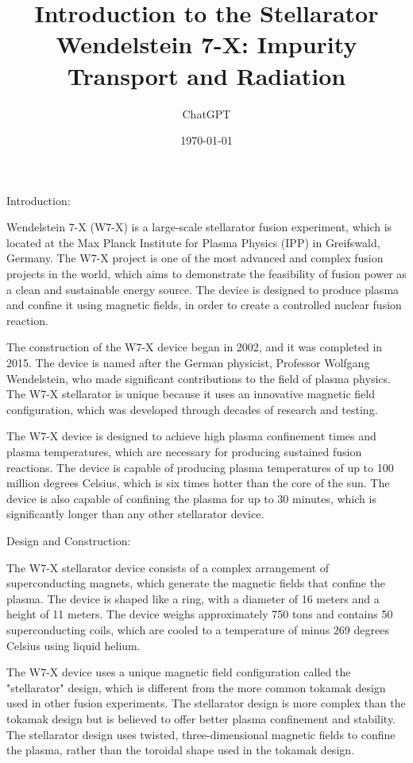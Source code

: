 \documentclass[12pt]{article}
\begin{document}
\title{Introduction to the Stellarator Wendelstein 7-X: Impurity Transport and Radiation}

\author{ChatGPT}

\date{\today}

\maketitle

Introduction:

Wendelstein 7-X (W7-X) is a large-scale stellarator fusion experiment, which is located at the Max Planck Institute for Plasma Physics (IPP) in Greifswald, Germany. The W7-X project is one of the most advanced and complex fusion projects in the world, which aims to demonstrate the feasibility of fusion power as a clean and sustainable energy source. The device is designed to produce plasma and confine it using magnetic fields, in order to create a controlled nuclear fusion reaction.

The construction of the W7-X device began in 2002, and it was completed in 2015. The device is named after the German physicist, Professor Wolfgang Wendelstein, who made significant contributions to the field of plasma physics. The W7-X stellarator is unique because it uses an innovative magnetic field configuration, which was developed through decades of research and testing.

The W7-X device is designed to achieve high plasma confinement times and plasma temperatures, which are necessary for producing sustained fusion reactions. The device is capable of producing plasma temperatures of up to 100 million degrees Celsius, which is six times hotter than the core of the sun. The device is also capable of confining the plasma for up to 30 minutes, which is significantly longer than any other stellarator device.

Design and Construction:

The W7-X stellarator device consists of a complex arrangement of superconducting magnets, which generate the magnetic fields that confine the plasma. The device is shaped like a ring, with a diameter of 16 meters and a height of 11 meters. The device weighs approximately 750 tons and contains 50 superconducting coils, which are cooled to a temperature of minus 269 degrees Celsius using liquid helium.

The W7-X device uses a unique magnetic field configuration called the "stellarator" design, which is different from the more common tokamak design used in other fusion experiments. The stellarator design is more complex than the tokamak design but is believed to offer better plasma confinement and stability. The stellarator design uses twisted, three-dimensional magnetic fields to confine the plasma, rather than the toroidal shape used in the tokamak design.
\end{document}
